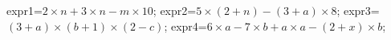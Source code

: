 \documentclass[exercice]{thedocument}%
\begin{document}
%
\>expr1=$2\times n+3\times n-m\times10$;%
\>expr2=$5\times(2+n)-(3+a)\times8$;%
\>expr3=$(3+a)\times(b+1)\times(2-c)$;%
\>expr4=$6\times a-7\times b+a\times a-(2+x)\times b$;%
%
\end{document}
